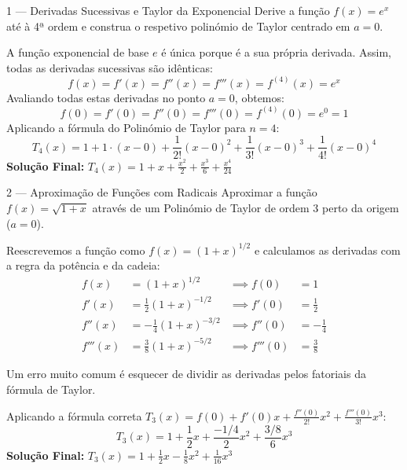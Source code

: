 \begin{exbox}{1 --- Derivadas Sucessivas e Taylor da Exponencial}
  Derive a função $f(x)=e^x$ até à 4ª ordem e construa o respetivo polinómio de Taylor centrado em $a=0$.
\end{exbox}
\begin{solbox}
  A função exponencial de base $e$ é única porque é a sua própria derivada. Assim, todas as derivadas sucessivas são idênticas:
  \[
    f(x) = f'(x) = f''(x) = f'''(x) = f^{(4)}(x) = e^x
  \]
  Avaliando todas estas derivadas no ponto $a=0$, obtemos:
  \[
    f(0) = f'(0) = f''(0) = f'''(0) = f^{(4)}(0) = e^0 = 1
  \]
  Aplicando a fórmula do Polinómio de Taylor para $n=4$:
  \[
    T_4(x) = 1 + 1\cdot(x-0) + \frac{1}{2!}(x-0)^2 + \frac{1}{3!}(x-0)^3 + \frac{1}{4!}(x-0)^4
  \]
  \textbf{Solução Final:} $\boxed{T_4(x) = 1 + x + \frac{x^2}{2} + \frac{x^3}{6} + \frac{x^4}{24}}$
\end{solbox}

\begin{exbox}{2 --- Aproximação de Funções com Radicais}
  Aproximar a função $f(x) = \sqrt{1+x}$ através de um Polinómio de Taylor de ordem 3 perto da origem ($a=0$).
\end{exbox}
\begin{solbox}
  Reescrevemos a função como $f(x) = (1+x)^{1/2}$ e calculamos as derivadas com a regra da potência e da cadeia:
  \begin{align*}
      f(x)   &= (1+x)^{1/2} & \implies f(0) &= 1 \\
      f'(x)  &= \frac{1}{2}(1+x)^{-1/2} & \implies f'(0) &= \frac{1}{2} \\
      f''(x) &= -\frac{1}{4}(1+x)^{-3/2} & \implies f''(0) &= -\frac{1}{4} \\
      f'''(x)&= \frac{3}{8}(1+x)^{-5/2} & \implies f'''(0) &= \frac{3}{8}
  \end{align*}
  \begin{warnbox}[title={Atenção aos Fatoriais!}]
    Um erro muito comum é esquecer de dividir as derivadas pelos fatoriais da fórmula de Taylor.
  \end{warnbox}
  Aplicando a fórmula correta $T_3(x) = f(0) + f'(0)x + \frac{f''(0)}{2!}x^2 + \frac{f'''(0)}{3!}x^3$:
  \[
    T_3(x) = 1 + \frac{1}{2}x + \frac{-1/4}{2}x^2 + \frac{3/8}{6}x^3
  \]
  \textbf{Solução Final:} $\boxed{T_3(x) = 1 + \frac{1}{2}x - \frac{1}{8}x^2 + \frac{1}{16}x^3}$
\end{solbox}

